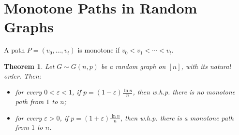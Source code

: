 \documentclass[fullpage,11pt]{article}
\theoremstyle{break}
\newtheorem{theorem}{Theorem}
\theoremstyle{definition}
\theoremstyle{break}
\begin{document}
\appendix
\section{Monotone Paths in Random Graphs}\label{app:monotone-threshold}

A path \(P=(v_0,\ldots,v_t)\) is monotone if \(v_0< v_1<\cdots <v_t\).

\begin{theorem}\label{thm:monotone-threshold}
Let \(G \sim G(n,p)\) be a random graph on \([n]\), with its natural order. Then:
\begin{itemize}
    \item for every \(0<\varepsilon<1\), if \(p=(1-\varepsilon)\frac{\ln n}{n}\), then w.h.p. there is no monotone path from \(1\) to \(n\);
    \item for every \(\varepsilon>0\), if \(p=(1+\varepsilon)\frac{\ln n}{n}\), then w.h.p. there is a monotone path from \(1\) to \(n\).
\end{itemize}
\end{theorem}
\end{document}
